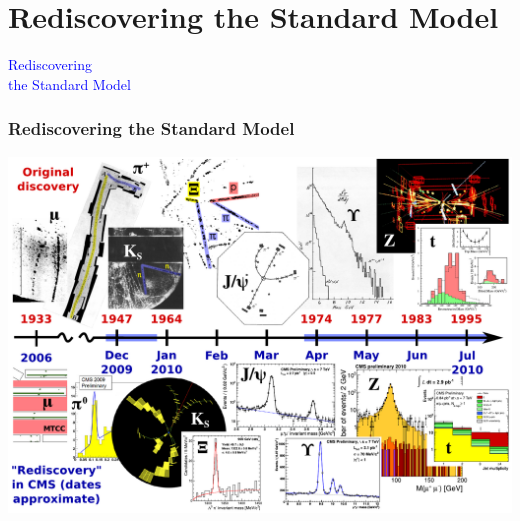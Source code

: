 \documentclass[compress]{beamer}
\begin{document}
\section*{Rediscovering the Standard Model}
\begin{frame}
\begin{center}
\Huge \textcolor{blue}{Rediscovering \\ the Standard Model}
\end{center}
\end{frame}

\begin{frame}
\frametitle{Rediscovering the Standard Model}
\includegraphics[width=\linewidth]{timeline.pdf}
\end{frame}
\end{document}
